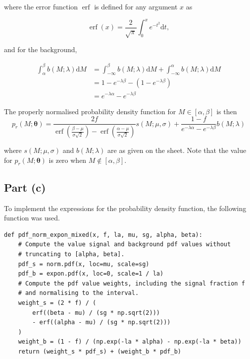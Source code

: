 \documentclass[12pt]{article}
\DeclareMathOperator{\erf}{erf}
\begin{document}
where the error function $\erf$ is defined for any argument $x$ as

\[
    \erf(x) = \frac{2}{\sqrt\pi}\int_0^xe^{-t^2}\mathrm{d}t,
\]

and for the background,

\begin{align*}
    \int_\alpha^\beta b(M;\lambda)\mathrm{d}M & = \int_{-\infty}^\beta b(M;\lambda)\mathrm{d}M + \int_{-\infty}^\alpha b(M;\lambda)\mathrm{d}M \\
    & = 1 - e^{-\lambda\beta} - (1 - e^{-\lambda\beta}) \\
    & = e^{-\lambda\alpha} - e^{-\lambda\beta}
\end{align*}

The properly normalised probability density function for $M\in[\alpha,\beta]$ is then
\begin{equation}
\label{eqpdf}
    p_r(M;\boldsymbol{\theta}) = \frac{2f}{\erf\left(\frac{\beta - \mu}{\sigma\sqrt{2}}\right) - \erf\left(\frac{\alpha - \mu}{\sigma\sqrt{2}}\right)}s(M;\mu,\sigma) + \frac{1-f}{e^{-\lambda\alpha} - e^{-\lambda\beta}}b(M;\lambda)
\end{equation}

where $s(M;\mu,\sigma)$ and $b(M;\lambda)$ are as given on the sheet.
Note that the value for $p_r(M;\boldsymbol{\theta})$ is zero when $M\notin[\alpha,\beta]$.

\subsection*{Part (c)}

To implement the expressions for the probability density function, the following function was used.

\begin{lstlisting}[caption=Function implementing pdf for part (c).,]
    def pdf_norm_expon_mixed(x, f, la, mu, sg, alpha, beta):
    # Compute the value signal and background pdf values without
    # truncating to [alpha, beta].
    pdf_s = norm.pdf(x, loc=mu, scale=sg)
    pdf_b = expon.pdf(x, loc=0, scale=1 / la)
    # Compute the pdf value weights, including the signal fraction f
    # and normalising to the interval.
    weight_s = (2 * f) / (
        erf((beta - mu) / (sg * np.sqrt(2)))
        - erf((alpha - mu) / (sg * np.sqrt(2)))
    )
    weight_b = (1 - f) / (np.exp(-la * alpha) - np.exp(-la * beta))
    return (weight_s * pdf_s) + (weight_b * pdf_b)
\end{lstlisting}
\end{document}
